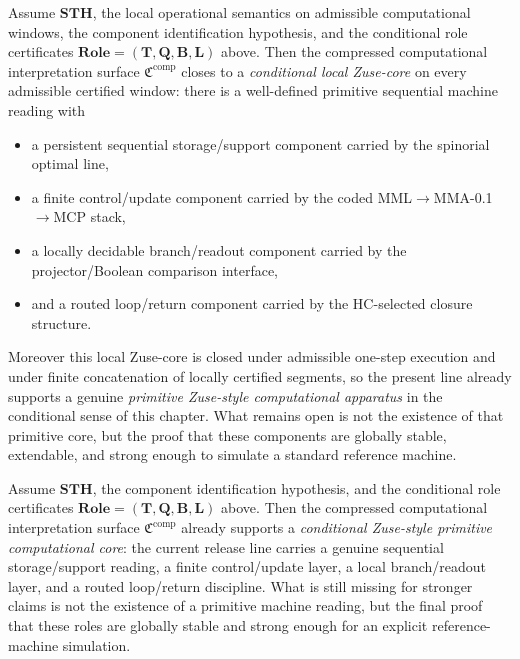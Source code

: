 \begin{theorem}
Assume $\mathbf{STH}$, the local operational semantics on admissible computational windows, the component identification hypothesis, and the conditional role certificates $\mathbf{Role}=(\mathbf T,\mathbf Q,\mathbf B,\mathbf L)$ above. Then the compressed computational interpretation surface $\mathfrak C^{\mathrm{comp}}$ closes to a \emph{conditional local Zuse-core} on every admissible certified window: there is a well-defined primitive sequential machine reading with
\begin{itemize}[leftmargin=2em]
 \item a persistent sequential storage/support component carried by the spinorial optimal line,
 \item a finite control/update component carried by the coded MML$\to$MMA-0.1$\to$MCP stack,
 \item a locally decidable branch/readout component carried by the projector/Boolean comparison interface,
 \item and a routed loop/return component carried by the HC-selected closure structure.
\end{itemize}
Moreover this local Zuse-core is closed under admissible one-step execution and under finite concatenation of locally certified segments, so the present line already supports a genuine \emph{primitive Zuse-style computational apparatus} in the conditional sense of this chapter. What remains open is not the existence of that primitive core, but the proof that these components are globally stable, extendable, and strong enough to simulate a standard reference machine.
\end{theorem}

\begin{corollary}
Assume $\mathbf{STH}$, the component identification hypothesis, and the conditional role certificates $\mathbf{Role}=(\mathbf T,\mathbf Q,\mathbf B,\mathbf L)$ above. Then the compressed computational interpretation surface $\mathfrak C^{\mathrm{comp}}$ already supports a \emph{conditional Zuse-style primitive computational core}: the current release line carries a genuine sequential storage/support reading, a finite control/update layer, a local branch/readout layer, and a routed loop/return discipline. What is still missing for stronger claims is not the existence of a primitive machine reading, but the final proof that these roles are globally stable and strong enough for an explicit reference-machine simulation.
\end{corollary}

